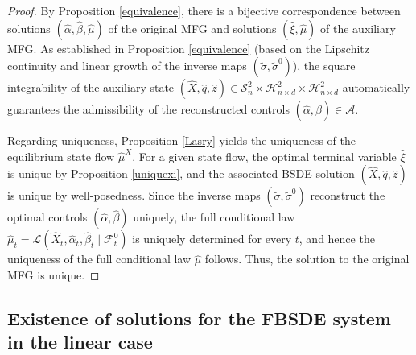 \documentclass[11pt,a4paper]{article}
\begin{document}
\begin{proof}
By Proposition \ref{equivalence}, there is a bijective correspondence between solutions $(\hat{\alpha}, \hat{\beta}, \hat{\mu})$ of the original MFG and solutions $(\hat{\xi}, \hat{\mu})$ of the auxiliary MFG. As established in Proposition \ref{equivalence} (based on the Lipschitz continuity and linear growth of the inverse maps $(\tilde{\sigma}, \tilde{\sigma}^0)$), the square integrability of the auxiliary state $(\hat{X}, \hat{q}, \hat{z}) \in \mathcal{S}^2_n \times \mathcal{H}^2_{n \times d} \times \mathcal{H}^2_{n \times d}$ automatically guarantees the admissibility of the reconstructed controls $(\hat{\alpha}, \hat{\beta}) \in \mathcal{A}$.

Regarding uniqueness, Proposition \ref{Lasry} yields the uniqueness of the equilibrium state flow $\hat{\mu}^X$. For a given state flow, the optimal terminal variable $\hat{\xi}$ is unique by Proposition \ref{uniquexi}, and the associated BSDE solution $(\hat{X}, \hat{q}, \hat{z})$ is unique by well-posedness. Since the inverse maps $(\tilde{\sigma}, \tilde{\sigma}^0)$ reconstruct the optimal controls $(\hat{\alpha}, \hat{\beta})$ uniquely, the full conditional law $\hat{\mu}_t=\mathcal{L}(\hat X_t,\hat\alpha_t,\hat\beta_t\mid \mathcal{F}_t^0)$ is uniquely determined for every $t$, and hence the uniqueness of the full conditional law $\hat{\mu}$ follows. Thus, the solution to the original MFG is unique.
\end{proof}




\subsection{Existence of solutions for the FBSDE system in the linear case}
\end{document}
